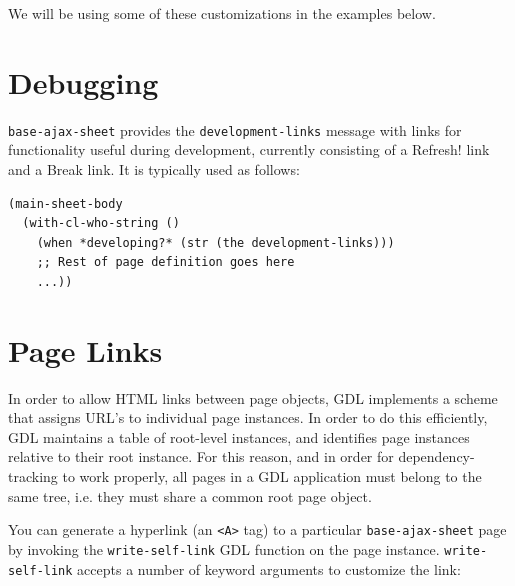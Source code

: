 \documentclass [11pt]{book}
\begin{document}
We will be using some of these customizations in the examples below.



\section{Debugging}

\label{sec:debugging}



\texttt{base-ajax-sheet} provides the \texttt{development-links} message with
links for functionality useful during development, currently consisting of a Refresh! link and a Break
link.  It is typically used as follows:

\begin{verbatim}(main-sheet-body
  (with-cl-who-string ()
    (when *developing?* (str (the development-links)))
    ;; Rest of page definition goes here
    ...))
\end{verbatim}



\section{Page Links}

\label{sec:pagelinks}



In order to allow HTML links between page objects, GDL implements a scheme that assigns
URL's to individual page instances.  In order to do this efficiently, GDL maintains a table of
root-level instances, and identifies page instances relative to their root instance.  For this reason,
and in order for dependency-tracking to work properly, all pages in a GDL application must belong to
the same tree, i.e. they must share a common root page object.



You can generate a hyperlink (an \texttt{<A>} tag) to a particular \texttt{base-ajax-sheet} page
by invoking the \texttt{write-self-link} GDL function on the page instance. \texttt{write-self-link} accepts
a number of keyword arguments to customize the link:
\end{document}
